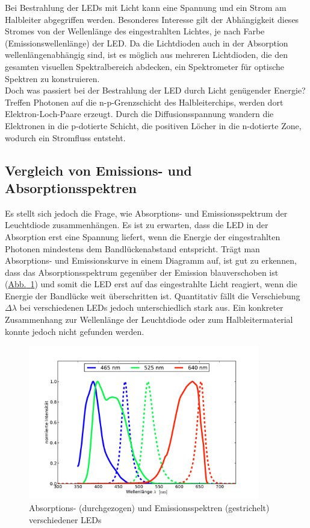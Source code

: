 \documentclass[11pt]{scrartcl}
\newcommand{\hypref}[2]{\hyperref[#2]{{#1}~\ref{#2}}}
\begin{document}
Bei Bestrahlung der LEDs mit Licht kann eine Spannung und ein Strom am Halbleiter abgegriffen werden. Besonderes Interesse gilt der Abhängigkeit dieses Stromes von der Wellenlänge des eingestrahlten Lichtes, je nach Farbe (Emissionswellenlänge) der LED. Da die Lichtdioden auch in der Absorption wellenlängenabhängig sind, ist es möglich aus mehreren Lichtdioden, die den gesamten visuellen Spektralbereich abdecken, ein Spektrometer für optische Spektren zu konstruieren.\\
Doch was passiert bei der Bestrahlung der LED durch Licht genügender Energie? Treffen Photonen auf die n-p-Grenzschicht des Halbleiterchips, werden dort Elektron-Loch-Paare erzeugt. Durch die Diffusionsspannung wandern die Elektronen in die p-dotierte Schicht, die positiven Löcher in die n-dotierte Zone, wodurch ein Stromfluss entsteht.

\subsection{Vergleich von Emissions- und Absorptionsspektren}
Es stellt sich jedoch die Frage, wie Absorptions- und Emissionsspektrum der Leuchtdiode zusammenh\"angen.
Es ist zu erwarten, dass die LED in der Absorption erst eine Spannung liefert, wenn die Energie der eingestrahlten Photonen mindestens dem Bandlückenabstand entspricht.
Tr\"agt man Absorptions- und Emissionskurve in einem Diagramm auf, ist gut zu erkennen, dass das Absorptionsspektrum gegen\"uber der Emission blauverschoben ist (\hypref{Abb.}{Absorption und Emission von LEDs}) und somit die LED erst auf das eingestrahlte Licht reagiert, wenn die Energie der Bandlücke weit überschritten ist. Quantitativ fällt die Verschiebung $\Delta \lambda$ bei verschiedenen LEDs jedoch unterschiedlich stark aus.
Ein konkreter Zusammenhang zur Wellenlänge der Leuchtdiode oder zum Halbleitermaterial konnte jedoch nicht gefunden werden.

\begin{figure}[ht]
\begin{center}
\includegraphics[width=0.9\textwidth]{absorp-emit.pdf}
\end{center}
\vspace{-1.5\baselineskip}
\caption{Absorptions- (durchgezogen) und Emissionsspektren (gestrichelt) verschiedener LEDs}
\label{Absorption und Emission von LEDs}
\end{figure}
\end{document}

